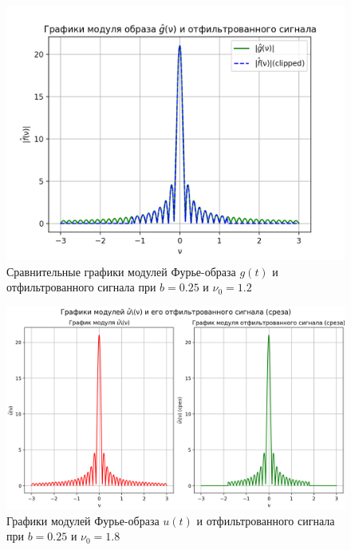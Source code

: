 \begin{figure}[ht!]
    \centering
    \includegraphics[scale=0.55]{media/1 task/high_freq/Fourier_Image_Comparison_0,25_-1,1981981981981982.png}
    \caption{Сравнительные графики модулей Фурье-образа $g(t)$ и отфильтрованного сигнала при $b=0.25$ и $\nu_0=1.2$}
    \label{fig:fourc_025_12}
\end{figure}

\clearpage

\begin{figure}[ht!]
    \centering
    \includegraphics[scale=0.55]{media/1 task/high_freq/Fourier_Image_0,25_-1,7987987987987988.png}
    \caption{Графики модулей Фурье-образа $u(t)$ и отфильтрованного сигнала при $b=0.25$ и $\nu_0=1.8$}
    \label{fig:four_025_18}
\end{figure}

